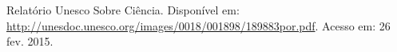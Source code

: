 \documentclass[brazil,ruledheader]{abntifes}
\begin{document}
\listoffigures



\tableofcontents{}















%


\begin{thebibliography}{9}

    Relatório Unesco Sobre Ciência. Disponível em: \url{http://unesdoc.unesco.org/images/0018/001898/189883por.pdf}.
    Acesso em: 26 fev. 2015.

\end{thebibliography}


\anexo
\end{document}
